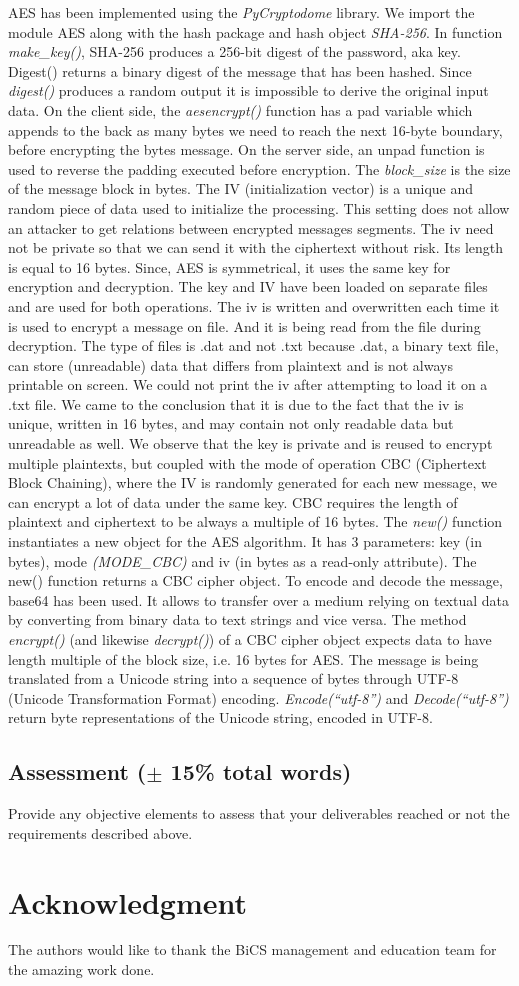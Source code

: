 AES has been implemented using the \textit{PyCryptodome} library. We import the module AES along with the hash package and hash object \textit{SHA-256}. In function \textit{make\_key()}, SHA-256 produces a 256-bit digest of the password, aka key. Digest() returns a binary digest of the message that has been hashed. Since \textit{digest()} produces a random output it is impossible to derive the original input data. On the client side, the \textit{aesencrypt()} function has a pad variable which appends to the back as many bytes we need to reach the next 16-byte boundary, before encrypting the bytes message. On the server side, an unpad function is used to reverse the padding executed before encryption. The \textit{block\_size} is the size of the message block in bytes. The IV (initialization vector) is a unique and random piece of data used to initialize the processing. This setting does not allow an attacker to get relations between encrypted messages segments. The iv need not be private so that we can send it with the ciphertext without risk. Its length is equal to 16 bytes. Since, AES is symmetrical, it uses the same key for encryption and decryption. The key and IV have been loaded on separate files and are used for both operations. The iv is written and overwritten each time it is used to encrypt a message on file. And it is being read from the file during decryption. The type of files is .dat and not .txt because .dat, a binary text file, can store (unreadable) data that differs from plaintext and is not always printable on screen. We could not print the iv after attempting to load it on a .txt file. We came to the conclusion that it is due to the fact that the iv is unique, written in 16 bytes, and may contain not only readable data but unreadable as well. We observe that the key is private and is reused to encrypt multiple plaintexts, but coupled with the mode of operation CBC (Ciphertext Block Chaining), where the IV is randomly generated for each new message, we can encrypt a lot of data under the same key. CBC requires the length of plaintext and ciphertext to be always a multiple of 16 bytes. The \textit{new()} function instantiates a new object for the AES algorithm. It has 3 parameters: key (in bytes), mode \textit{(MODE\_CBC)} and iv (in bytes as a read-only attribute). The new() function returns a CBC cipher object. To encode and decode the message, base64 has been used. It allows to transfer over a medium relying on textual data by converting from binary data to text strings and vice versa. The method \textit{encrypt()} (and likewise \textit{decrypt()}) of a CBC cipher object expects data to have length multiple of the block size, i.e. 16 bytes for AES. The message is being translated from a Unicode string into a sequence of bytes through UTF-8 (Unicode Transformation Format) encoding. \textit{Encode(“utf-8”)} and \textit{Decode(“utf-8”)} return byte representations of the Unicode string, encoded in UTF-8.

\subsection{Assessment ($\pm$ 15\% total words)}
Provide any objective elements to assess that your deliverables reached or not the requirements described above. 
\section*{Acknowledgment}
The authors would like to thank the BiCS management and education team for the amazing work done.